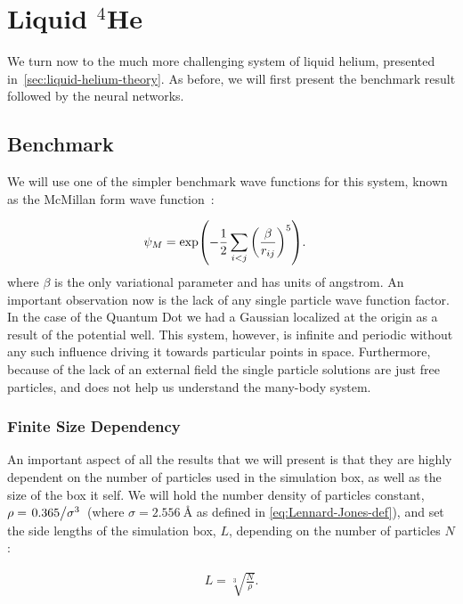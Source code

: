 \documentclass[Thesis.tex]{subfiles}
\begin{document}
\chapter{Liquid $^4$He}
\label{chp:liquid-helium}

We turn now to the much more challenging system of liquid helium, presented
in~\cref{sec:liquid-helium-theory}. As before, we will first present the
benchmark result followed by the neural networks.


\section{Benchmark}

We will use one of the simpler benchmark wave functions for this system, known
as the McMillan form wave function~\cite{McMillan-1965}:

\begin{align}
  \label{eq:McMillan-wave-function-def}
  \psi_{M} &= \exp(-\frac{1}{2}\sum_{i<j} \qty(\frac{\beta}{r_{ij}})^5).
\end{align}
where $\beta$ is the only variational parameter and has units of angstrom. An
important observation now is the lack of any single particle wave function
factor. In the case of the Quantum Dot we had a Gaussian localized at the origin
as a result of the potential well. This system, however, is infinite and
periodic without any such influence driving it towards particular points in
space. Furthermore, because of the lack of an external field the single particle
solutions are just free particles, and does not help us understand the many-body
system.

\subsection{Finite Size Dependency}

An important aspect of all the results that we will present is that they are
highly dependent on the number of particles used in the simulation box, as well
as the size of the box it self. We will hold the number density of particles
constant, $\rho = \flatfrac{\num{0.365}}{\sigma^3}$ (where $\sigma =
\SI{2.556}{\angstrom}$ as defined in \cref{eq:Lennard-Jones-def}), and set the
side lengths of the simulation box, $L$, depending on
the number of particles $N$:

\begin{align}
  L = \sqrt[3]{\frac{N}{\rho}}.
\end{align}
\end{document}
